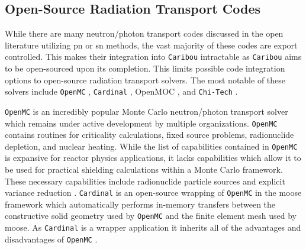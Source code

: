 \subsection{Open-Source Radiation Transport Codes}
\label{lit_review:radiation_transport:codes}

While there are many neutron/photon transport codes discussed in the open literature utilizing \acrshort{pn} or \acrshort{sn} methods, the vast majority of these codes are export controlled. This makes their integration into \texttt{Caribou} intractable as \texttt{Caribou} aims to be open-sourced upon its completion. This limits possible code integration options to open-source radiation transport solvers. The most notable of these solvers include \texttt{OpenMC} \cite{openmc}, \texttt{Cardinal} \cite{cardinal}, OpenMOC \cite{openmoc}, and \texttt{Chi-Tech} \cite{massively_parallel_sweeps}.

\texttt{OpenMC} is an incredibly popular Monte Carlo neutron/photon transport solver which remains under active development by multiple organizations. \texttt{OpenMC} contains routines for criticality calculations, fixed source problems, radionuclide depletion, and nuclear heating. While the list of capabilities contained in \texttt{OpenMC} is expansive for reactor physics applications, it lacks capabilities which allow it to be used for practical shielding calculations within a Monte Carlo framework. These necessary capabilities include radionuclide particle sources and explicit variance reduction \cite{openmc}. \texttt{Cardinal} is an open-source wrapping of \texttt{OpenMC} in the \acrshort{moose} framework which automatically performs in-memory transfers between the constructive solid geometry used by \texttt{OpenMC} and the finite element mesh used by \acrshort{moose}. As \texttt{Cardinal} is a wrapper application it inherits all of the advantages and disadvantages of \texttt{OpenMC} \cite{cardinal}.

